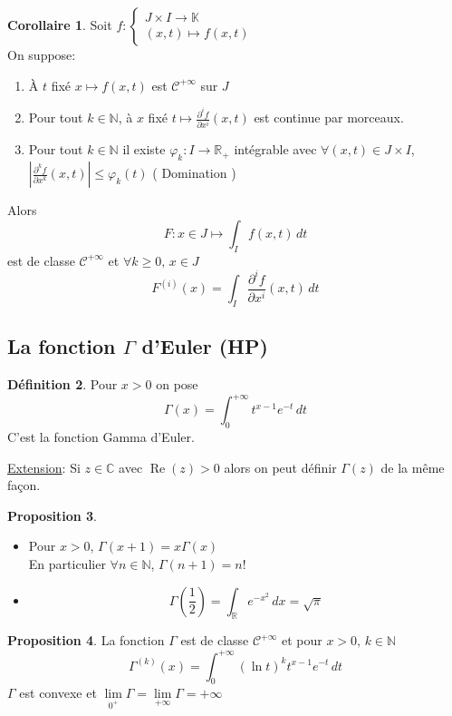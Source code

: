 \documentclass[10pt,a4paper]{article}
\theoremstyle{definition}
\newtheorem{proposition}{Proposition}[section]
\newtheorem{corollary}[proposition]{Corollaire}
\newtheorem{definition}[proposition]{Définition}
\DeclareMathOperator{\re}{Re}
\begin{document}
\begin{corollary}
    Soit \(f:\begin{cases} J \times I \to \mathbb{K} \\ (x, t) \mapsto f(x, t)\end{cases}\) \\
    On suppose:
    \begin{enumerate}
        \item À \(t\) fixé \(x \mapsto f(x, t)\) est \(\mathcal{C}^{+\infty}\) sur \(J\)
        \item Pour tout \(k \in \mathbb{N}\), à \(x\) fixé \(t \mapsto \frac{\partial^i f}{\partial x^i}(x, t)\) est continue par morceaux.
        \item Pour tout \(k \in \mathbb{N}\) il existe \(\varphi_k: I \to \mathbb{R}_+\) intégrable avec \(\forall (x, t) \in J \times I\), \(\left| \frac{\partial^k f}{\partial x^k}(x, t) \right| \leq \varphi_k(t)\) ( Domination )
    \end{enumerate}
    Alors \[F: x \in J \mapsto \int_{I} f(x, t) \,dt\] est de classe \(\mathcal{C}^{+\infty}\) et \(\forall k \geq 0 ,\, x \in J\)
    \[\boxed{F^{(i)}(x) = \int_{I} \frac{\partial^i f}{\partial x^i}(x, t) \,dt}\]
\end{corollary}

\subsection{La fonction \(\Gamma\) d'Euler (HP)}
\begin{definition}
    Pour \(x > 0\) on pose
    \[\Gamma(x) = \int_{0}^{+\infty}t^{x - 1}e^{-t} \,dt\]
    C'est la fonction Gamma d'Euler.
\end{definition}
\noindent \uline{Extension}: Si \(z \in \mathbb{C}\) avec \(\re(z) > 0\) alors on peut définir \(\Gamma(z)\) de la même façon.
\begin{proposition}
    \hfill
    \begin{itemize}
        \item Pour \(x > 0\), \(\Gamma(x + 1) = x\Gamma(x)\) \\ En particulier \(\forall n \in \mathbb{N}\), \(\Gamma(n + 1) = n!\)
        \item \[\Gamma\left(\frac{1}{2}\right) = \int_{\mathbb{R}} e^{-x^2} \,dx = \sqrt{\pi}\]
    \end{itemize}
\end{proposition}
\begin{proposition}
    La fonction \(\Gamma\) est de classe \(\mathcal{C}^{+\infty}\) et pour \(x > 0,\, k \in \mathbb{N}\)
    \[\Gamma^{(k)}(x) = \int_{0}^{+\infty}(\ln t)^k t^{x - 1} e^{-t} \,dt\]
    \(\Gamma\) est convexe et \(\lim\limits_{0^+} \Gamma = \lim\limits_{+\infty} \Gamma = +\infty\)
\end{proposition}
\end{document}
